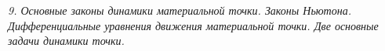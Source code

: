 \emph{9. Основные законы динамики материальной точки. Законы Ньютона.
Дифференциальные уравнения движения материальной точки. Две основные задачи
динамики точки.}

\newpage
